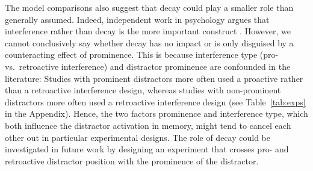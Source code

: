 \documentclass{cambridge7A}\usepackage[]{graphicx}\usepackage[]{color}
\newcommand{\revFE}[1]{#1}
\begin{document}
\revFE{The model comparisons also suggest} that decay could play a smaller role than generally assumed. Indeed, independent work in psychology argues that interference rather than decay is the more important construct  \citep{OberauerLewandowsky2014,OberauerLewandowsky2013,berman2009search}. 
However, we cannot conclusively say whether decay has no impact or is only disguised by a counteracting effect of prominence. This is because interference type (pro- vs.\ retroactive interference) and distractor prominence are confounded in the literature:
Studies with prominent distractors more often used a proactive rather than a retroactive interference design, whereas studies with non-prominent distractors more often used a retroactive interference design (see Table~\ref{tab:exps} in the Appendix).
Hence, the two factors prominence and interference type, which both influence the distractor activation in memory, might tend to cancel each other out in particular experimental designs. 
The role of decay could be investigated in future work by designing an experiment that crosses pro- and retroactive distractor position with the prominence of the distractor.
\end{document}
